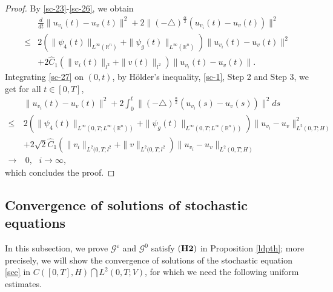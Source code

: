 \documentclass[11pt]{article}
\numberwithin{equation}{section}
\theoremstyle{plain}
\def\leq{\leqslant}
\begin{document}
\begin{proof}
    By \eqref{sc-23}-\eqref{sc-26},
    we obtain
    \begin{align}\label{sc-27}
        & \frac{d}{dt} \| u_{v_i}(t) - u_v(t) \|^2
        + 2 \| (-\triangle)^{\frac{\alpha}{2}} \left( u_{v_i}(t) - u_v(t) \right) \|^2
        \nonumber \\
        \leq & 2
        \left( \| \psi_4(t) \|_{L^\infty(\mathbb{R}^n)}
        + \| \psi_g(t) \|_{L^\infty(\mathbb{R}^n)}
        \right)
        \| u_{v_i}(t) - u_v(t) \|^2
        \nonumber \\
        & + 2 \hat{C}_1
        \left(
        \| v_i(t) \|_{l^2}
        + \| v(t) \|_{l^2}
        \right)
        \| u_{v_i}(t) - u_v(t) \|.
    \end{align}
    Integrating \eqref{sc-27}
    on $(0,t)$,
    by H\"{o}lder's inequality, \eqref{sc-1}, Step 2 and Step 3,
    we  get for all $t\in [0, T]$,
    \begin{align} \label{sc-28}
        & \| u_{v_i}(t) - u_v(t) \|^2
        + 2 \int_0^t
        \| (-\triangle)^{\frac{\alpha}{2}} \left( u_{v_i}(s) - u_v(s) \right) \|^2 ds
        \nonumber \\
        \leq & 2
        \left(   \| \psi_4(t) \|_{L^\infty(0,T; L^\infty(\mathbb{R}^n))}
        + \| \psi_g(t) \|_{L^\infty(0,T; L^\infty(\mathbb{R}^n))}
        \right)
        \| u_{v_i} - u_v \|_{L^2(0,T; H)}^2
        \nonumber \\
        & + 2 \sqrt{2} \hat{C}_1
        \left(
        \| v_i \|_{L^2(0,T; l^2}
        + \| v \|_{L^2(0,T; l^2}
        \right)
        \| u_{v_i} - u_v \|_{L^2(0,T; H)}  \nonumber \\
        \rightarrow & \ 0, \ \ \  i \to  \infty,
    \end{align}
    which concludes the proof.
 \end{proof}





 \subsection{Convergence of solutions of stochastic equations }

 In this subsection, we prove
 $\mathcal{G}^\varepsilon$
 and  $\mathcal{G}^0$
 satisfy
 $({\bf H2})$
 in Proposition \ref{ldpth}; more precisely, we will show  the
 convergence of  solutions
 of the stochastic equation
 \eqref{sce}
 in
 $C([0,T], H) \bigcap L^2(0,T; V)$,
 for which we need the following uniform
 estimates.
\end{document}

